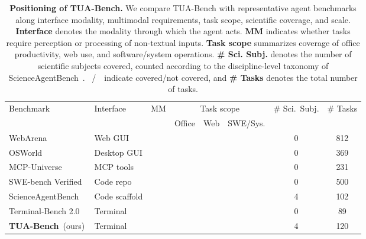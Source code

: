 \documentclass{llmxive}
\providecommand{\cmark}{\ding{51}}
\providecommand{\xmark}{\ding{55}}
\providecommand{\benchname}{\mbox{TUA-Bench}\xspace}
\providecommand{\arraystretch}{1.15}
\begin{document}
\begin{table}[t]
\small
\centering
\setlength{\tabcolsep}{4pt}
\renewcommand{\arraystretch}{1.15}
\begin{tabular}{l l c c c c c c}
\toprule
\multirow{2}{*}{Benchmark} & \multirow{2}{*}{Interface} & \multirow{2}{*}{MM} & \multicolumn{3}{c}{Task scope} & \multirow{2}{*}{\# Sci.\ Subj.} & \multirow{2}{*}{\# Tasks} \\
\cmidrule(lr){4-6} & & & Office & Web & SWE/Sys. & & \\
\midrule
WebArena~\citep{zhou2024webarena}
& Web GUI & \xmark & \xmark & \cmark & \xmark & 0 & 812 \\
 
OSWorld~\citep{xie2024osworld}
& Desktop GUI & \cmark & \cmark & \cmark & \cmark & 0 & 369 \\
 
MCP-Universe~\citep{luo2025mcp}
& MCP tools & \xmark & \xmark & \cmark & \cmark & 0 & 231 \\
 
SWE-bench Verified~\citep{jimenez2023swe}
& Code repo & \xmark & \xmark & \xmark & \cmark & 0 & 500 \\
 
ScienceAgentBench~\citep{chen2025scienceagentbench}
& Code scaffold & \xmark & \xmark & \xmark & \xmark & 4 & 102 \\
 
Terminal-Bench 2.0~\citep{merrill2026terminalbench}
& Terminal & \xmark & \xmark & \xmark & \cmark & 0 & 89 \\
\midrule
\textbf{\benchname}~(ours)
& Terminal & \cmark & \cmark & \cmark & \cmark & 4 & 120 \\
\bottomrule
\end{tabular}
\caption{\textbf{Positioning of \benchname.} We compare \benchname with representative agent benchmarks along interface modality, multimodal requirements, task scope, scientific coverage, and scale. \textbf{Interface} denotes the modality through which the agent acts. \textbf{MM} indicates whether tasks require perception or processing of non-textual inputs. \textbf{Task scope} summarizes coverage of office productivity, web use, and software/system operations. \textbf{\# Sci. Subj.} denotes the number of scientific subjects covered, counted according to the discipline-level taxonomy of ScienceAgentBench~\citep{chen2025scienceagentbench}. \cmark~/~\xmark~indicate covered/not covered, and \textbf{\# Tasks} denotes the total number of tasks.}
\label{tab:positioning}
\end{table}
\end{document}
